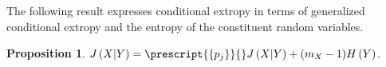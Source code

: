 \documentclass[pdflatex]{sn-jnl}%
\theoremstyle{thmstyleone}
\newtheorem{proposition}{Proposition}
\theoremstyle{thmstyletwo}%
\theoremstyle{thmstylethree}%
\newtheorem{remark}{Remark}%
\begin{document}
The following result expresses conditional extropy in terms of generalized conditional extropy and the entropy of the constituent random variables.

\begin{proposition}
    $J\left( X|Y \right)=\prescript{\{p_j\}}{}J\left(X|Y \right) + (m_{X}-1)H\left(Y\right)$.
\end{proposition}
\end{document}
